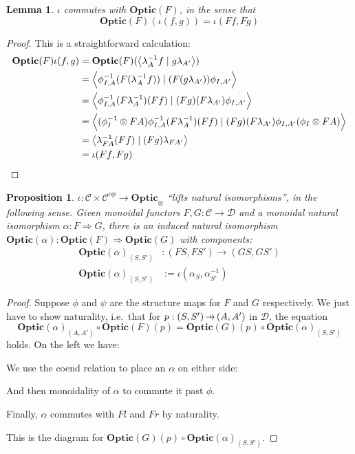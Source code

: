 \documentclass[11pt,letterpaper]{article}
\theoremstyle{plain}
\newtheorem{proposition}[theorem]{Proposition}
\newtheorem{lemma}[theorem]{Lemma}
\theoremstyle{definition}
\newcommand{\C}{\mathscr{C}}
\newcommand{\D}{\mathscr{D}}
\newcommand{\Optic}{\mathbf{Optic}}
\newcommand{\op}{\mathrm{op}}
\newcommand{\rep}[2]{{\ensuremath \left\langle #1 \mid #2 \right\rangle}}
\newcommand{\hto}{\ensuremath{\,\mathaccent\shortmid\rightarrow\,}}
\begin{document}
\begin{lemma}\label{lem:iota-commute-with-opticf}
$\iota$ commutes with $\Optic(F)$, in the sense that
\[ \Optic(F)(\iota(f, g)) = \iota(Ff, Fg) \]
\end{lemma}
\begin{proof}
This is a straightforward calculation:
  \begin{align*}
    \Optic(F)\iota(f, g)
    &= \Optic(F)(\rep{\lambda_A^{-1} f}{g \lambda_{A'}}) \\
    &= \rep{\phi^{-1}_{I,A} (F(\lambda_A^{-1} f))}{(F(g \lambda_{A'})) \phi_{I,A'}} \\
    &= \rep{\phi^{-1}_{I,A} (F\lambda_A^{-1}) (Ff)}{(Fg)(F \lambda_{A'}) \phi_{I,A'}} \\
    &= \rep{(\phi^{-1}_I \otimes FA) \phi^{-1}_{I,A} (F\lambda_A^{-1}) (Ff)}{(Fg)(F \lambda_{A'}) \phi_{I,A'} (\phi_I \otimes FA)} \\
    &= \rep{\lambda_{FA}^{-1} (Ff)}{(Fg)\lambda_{FA'}} \\
    &= \iota(Ff, Fg)
  \end{align*}
\end{proof}

\begin{proposition}\label{prop:iota-naturality}
$\iota : \C \times \C^\op \to \Optic_\otimes$ ``lifts natural isomorphisms'', in the following sense. Given monoidal functors $F, G : \C \to \D$ and a monoidal natural isomorphism $\alpha : F \Rightarrow G$, there is an induced natural isomorphism $\Optic(\alpha) : \Optic(F) \Rightarrow \Optic(G)$ with components:
\begin{align*}
{\Optic(\alpha)}_{(S, S')} &: (FS, FS') \to (GS, GS') \\
{\Optic(\alpha)}_{(S, S')} &:= \iota(\alpha_{S}, \alpha^{-1}_{S'})
\end{align*}
\end{proposition}
\begin{proof}
Suppose $\phi$ and $\psi$ are the structure maps for $F$ and $G$ respectively. We just have to show naturality, i.e.\ that for $p : (S, S') \hto (A, A')$ in $\D$, the equation \[\Optic(\alpha)_{(A, A')} \circ \Optic(F)(p) = \Optic(G)(p) \circ \Optic(\alpha)_{(S, S')}\] holds. On the left we have:
  \begin{center}
    
  \end{center}
  We use the coend relation to place an $\alpha$ on either side:
  \begin{center}
    
  \end{center}
  And then monoidality of $\alpha$ to commute it past $\phi$.
  \begin{center}
    
  \end{center}
  Finally, $\alpha$ commutes with $F l$ and $F r$ by naturality.
  \begin{center}
    
  \end{center}
  This is the diagram for $\Optic(G)(p) \circ {\Optic(\alpha)}_{(S, S')}$.
\end{proof}
\end{document}
